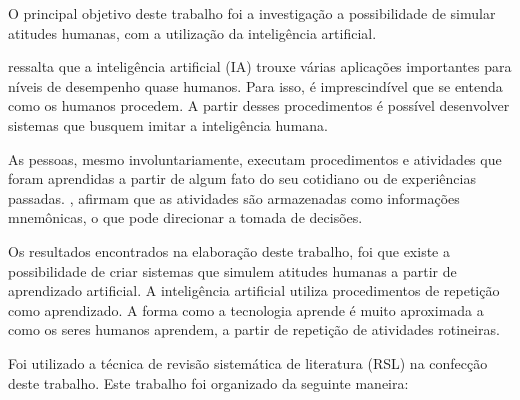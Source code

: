 O principal objetivo deste trabalho foi a investigação a possibilidade de simular atitudes humanas, com a utilização da inteligência artificial.

\cite{anthes} ressalta que a inteligência artificial (IA) trouxe várias aplicações importantes para níveis de desempenho quase humanos. Para isso, é imprescindível que se entenda como os humanos procedem. A partir desses procedimentos é possível desenvolver sistemas que busquem imitar a inteligência humana.

As pessoas, mesmo involuntariamente, executam procedimentos e atividades que foram aprendidas a partir de algum fato do seu cotidiano ou de experiências passadas. \cite{buzsaki}, afirmam que as atividades são armazenadas como informações mnemônicas, o que pode direcionar a tomada de decisões.

Os resultados encontrados na elaboração deste trabalho, foi que existe a possibilidade de criar sistemas que simulem atitudes humanas a partir de aprendizado artificial. A inteligência artificial utiliza procedimentos de repetição como  aprendizado. A forma como a tecnologia aprende é muito aproximada a como os seres humanos aprendem, a partir de repetição de atividades rotineiras.

Foi utilizado a técnica de revisão sistemática de literatura (RSL) na confecção deste trabalho. Este trabalho foi organizado da seguinte maneira: 

